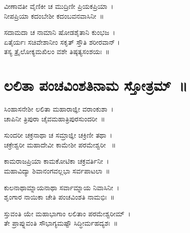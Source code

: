 ವೀಣಾವತೀ ವೈಣಿಕೀ ಚ ಮುದ್ರಿಣೀ ಪ್ರಿಯಕಪ್ರಿಯಾ~।\\
ನೀಪಪ್ರಿಯಾ ಕದಂಬೇಶೀ ಕದಂಬವನವಾಸಿನೀ~॥

ಸದಾಮದಾ ಚ ನಾಮಾನಿ ಷೋಡಶೈತಾನಿ ಕುಂಭಜ~।\\
ಏತೈರ್ಯಃ ಸಚಿವೇಶಾನೀಂ ಸಕೃತ್ ಸ್ತೌತಿ ಶರೀರವಾನ್ ।\\
ತಸ್ಯ ತ್ರೈಲೋಕ್ಯಮಖಿಲಂ ವಶೇ ತಿಷ್ಠತ್ಯಸಂಶಯಃ~॥
\newpage
\section{ಲಲಿತಾ ಪಂಚವಿಂಶತಿನಾಮ ಸ್ತೋತ್ರಮ್~॥}
ಸಿಂಹಾಸನೇಶೀ ಲಲಿತಾ ಮಹಾರಾಜ್ಞೀ ವರಾಂಕುಶಾ~।\\
ಚಾಪಿನೀ ತ್ರಿಪುರಾ ಚೈವಮಹಾತ್ರಿಪುರಸುಂದರೀ~॥

ಸುಂದರೀ ಚಕ್ರನಾಥಾ ಚ ಸಮ್ರಾಜ್ಞೀ ಚಕ್ರಿಣೀ ತಥಾ~।\\
ಚಕ್ರೇಶ್ವರೀ ಮಹಾದೇವೀ ಕಾಮೇಶೀ ಪರಮೇಶ್ವರೀ ~॥

ಕಾಮರಾಜಪ್ರಿಯಾ ಕಾಮಕೋಟಿಕಾ ಚಕ್ರವರ್ತಿನೀ~।\\
ಮಹಾವಿದ್ಯಾ ಶಿವಾನಂಗವಲ್ಲಭಾ ಸರ್ವಪಾಟಲಾ~॥

ಕುಲನಾಥಾಮ್ನಾಯನಾಥಾ ಸರ್ವಾಮ್ನಾಯ ನಿವಾಸಿನೀ~।\\
ಶೃಂಗಾರ ನಾಯಿಕಾ ಚೇತಿ ಪಂಚವಿಂಶತಿ ನಾಮಭಿಃ~॥

ಸ್ತುವಂತಿ ಯೇ ಮಹಾಭಾಗಾಂ ಲಲಿತಾಂ ಪರಮೇಶ್ವರೀಮ್~।\\
ತೇ ಪ್ರಾಪ್ನುವಂತಿ ಸೌಭಾಗ್ಯಮಷ್ಟೌ ಸಿದ್ಧೀರ್ಮಹದ್ಯಶಃ~॥

